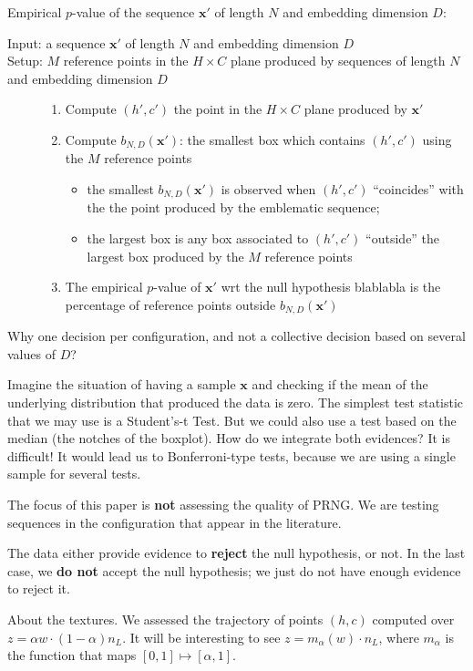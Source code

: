 \documentclass[paper=a4, fontsize=11pt]{scrartcl}
\begin{document}
Empirical $p$-value of the sequence $\bm x'$ of length $N$ and embedding dimension $D$:
\begin{description}
    \item[Input: a sequence $\bm x'$ of length $N$ and  embedding dimension $D$]
    \item[Setup: $M$ reference points in the $H \times C$ plane produced by sequences of length $N$ and embedding dimension $D$]
    \begin{enumerate}
        \item Compute $(h',c')$ the point in the $H\times C$ plane produced by $\bm x'$
        \item Compute $b_{N,D}(\bm x')$: the smallest box which contains $(h',c')$ using the $M$ reference points
            \begin{itemize}
                \item the smallest $b_{N,D}(\bm x')$ is observed when $(h',c')$ ``coincides'' with the the point produced by the emblematic sequence;
                \item the largest box is any box associated to $(h',c')$ ``outside'' the largest box produced by the $M$ reference points
            \end{itemize}
        \item The empirical $p$-value of $\bm x'$ wrt the null hypothesis blablabla is the percentage of reference points outside $b_{N,D}(\bm x')$
    \end{enumerate}
\end{description}

Why one decision per configuration, and not a collective decision based on several values of $D$?

Imagine the situation of having a sample $\bm x$ and checking if the mean of the underlying distribution that produced the data is zero.
The simplest test statistic that we may use is a Student's-t Test.
But we could also use a test based on the median (the notches of the boxplot).
How do we integrate both evidences?
It is difficult!
It would lead us to Bonferroni-type tests, because we are using a single sample for several tests.

The focus of this paper is \textbf{not} assessing the quality of PRNG.
We are testing sequences in the configuration that appear in the literature.

The data either provide evidence to \textbf{reject} the null hypothesis, or not.
In the last case, we \textbf{do not} accept the null hypothesis; we just do not have enough evidence to reject it.

About the textures.
We assessed the trajectory of points $(h,c)$ computed over $z=\alpha w \cdot (1-\alpha) n_L$.
It will be interesting to see 
$z = m_\alpha (w) \cdot n_L$, where 
$m_\alpha$ is the function that maps $[0,1]\mapsto [\alpha,1]$.
\end{document}
